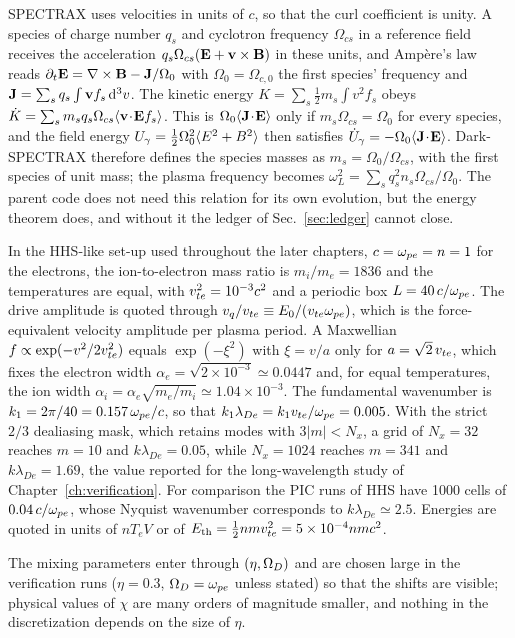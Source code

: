 SPECTRAX uses velocities in units of $c$, so that the curl coefficient is unity. A species of charge number $q_s$ and cyclotron frequency $\Omega_{cs}$ in a reference field receives the acceleration $q_s\Omega_{cs}(\mathbf{E}+\mathbf{v}\times\mathbf{B})$ in these units, and Ampère's law reads $\partial_t\mathbf{E}=\nabla\times\mathbf{B}-\mathbf{J}/\Omega_0$ with $\Omega_0=\Omega_{c,0}$ the first species' frequency and $\mathbf{J}=\sum_sq_s\int\mathbf{v} f_s\,\mathrm{d}^3v$. The kinetic energy $K=\sum_s\tfrac12m_s\int v^2f_s$ obeys $\dot K=\sum_sm_sq_s\Omega_{cs}\langle \mathbf{v}\!\cdot\!\mathbf{E} f_s\rangle$. This is $\Omega_0\langle \mathbf{J}\!\cdot\!\mathbf{E}\rangle$ only if $m_s\Omega_{cs}=\Omega_0$ for every species, and the field energy $U_\gamma=\tfrac12\Omega_0^2\langle E^2+B^2\rangle$ then satisfies $\dot U_\gamma=-\Omega_0\langle \mathbf{J}\!\cdot\!\mathbf{E}\rangle$. Dark-SPECTRAX therefore defines the species masses as $m_s=\Omega_0/\Omega_{cs}$, with the first species of unit mass; the plasma frequency becomes $\omega_L^2=\sum_sq_s^2n_s\Omega_{cs}/\Omega_0$. The parent code does not need this relation for its own evolution, but the energy theorem does, and without it the ledger of Sec.~\ref{sec:ledger} cannot close.

In the HHS-like set-up used throughout the later chapters, $c=\omega_{pe}=n=1$ for the electrons, the ion-to-electron mass ratio is $m_i/m_e=1836$ and the temperatures are equal, with $v_{te}^2=10^{-3}c^2$ and a periodic box $L=40\,c/\omega_{pe}$. The drive amplitude is quoted through $v_q/v_{te}\equiv E_0/(v_{te}\omega_{pe})$, which is the force-equivalent velocity amplitude per plasma period. A Maxwellian $f\propto\exp(-v^2/2v_{te}^2)$ equals $\exp(-\xi^2)$ with $\xi=v/a$ only for $a=\sqrt2\,v_{te}$, which fixes the electron width $\alpha_e=\sqrt{2\times10^{-3}}\simeq0.0447$ and, for equal temperatures, the ion width $\alpha_i=\alpha_e\sqrt{m_e/m_i}\simeq1.04\times10^{-3}$. The fundamental wavenumber is $k_1=2\pi/40=0.157\,\omega_{pe}/c$, so that $k_1\lambda_{De}=k_1v_{te}/\omega_{pe}=0.005$. With the strict $2/3$ dealiasing mask, which retains modes with $3|m|<N_x$, a grid of $N_x=32$ reaches $m=10$ and $k\lambda_{De}=0.05$, while $N_x=1024$ reaches $m=341$ and $k\lambda_{De}=1.69$, the value reported for the long-wavelength study of Chapter~\ref{ch:verification}. For comparison the PIC runs of HHS have 1000 cells of $0.04\,c/\omega_{pe}$, whose Nyquist wavenumber corresponds to $k\lambda_{De}\simeq2.5$. Energies are quoted in units of $nT_eV$ or of $E_{\rm th}=\tfrac12 nmv_{te}^2=5\times10^{-4}nmc^2$.

The mixing parameters enter through $(\eta,\Omega_D)$ and are chosen large in the verification runs ($\eta=0.3$, $\Omega_D=\omega_{pe}$ unless stated) so that the shifts are visible; physical values of $\chi$ are many orders of magnitude smaller, and nothing in the discretization depends on the size of $\eta$.


